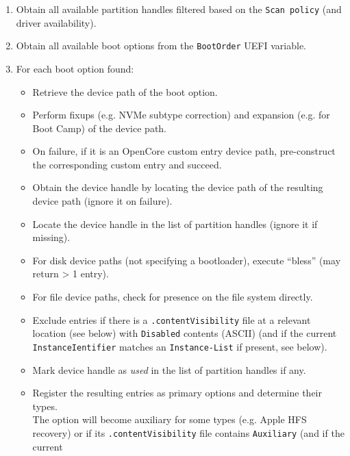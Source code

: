 \documentclass[]{article}
\providecommand{\tightlist}{%
  \setlength{\itemsep}{0pt}\setlength{\parskip}{0pt}}
\begin{document}
\begin{enumerate}
\tightlist
\item Obtain all available partition handles filtered based on the \texttt{Scan policy} (and driver availability).
\item Obtain all available boot options from the \texttt{BootOrder} UEFI variable.
\item For each boot option found:
  \begin{itemize}
  \item Retrieve the device path of the boot option.
  \item Perform fixups (e.g. NVMe subtype correction) and expansion (e.g. for Boot Camp) of the device path.
  \item On failure, if it is an OpenCore custom entry device path, pre-construct the corresponding custom entry and succeed.
  \item Obtain the device handle by locating the device path of the resulting device path (ignore it on failure).
  \item Locate the device handle in the list of partition handles (ignore it if missing).
  \item For disk device paths (not specifying a bootloader), execute ``bless'' (may return > 1 entry).
  \item For file device paths, check for presence on the file system directly.
  \item Exclude entries if there is a \texttt{.contentVisibility} file at a relevant location (see below)
  with \texttt{Disabled} contents (ASCII) (and if the current \texttt{InstanceIentifier} matches an \texttt{Instance-List}
  if present, see below).
  \item Mark device handle as \textit{used} in the list of partition handles if any.
  \item Register the resulting entries as primary options and determine their types. \\
  The option will become auxiliary for some types (e.g. Apple HFS recovery)
  or if its \texttt{.contentVisibility} file contains \texttt{Auxiliary} (and if the current

\end{itemize}
\end{enumerate}
\end{document}
